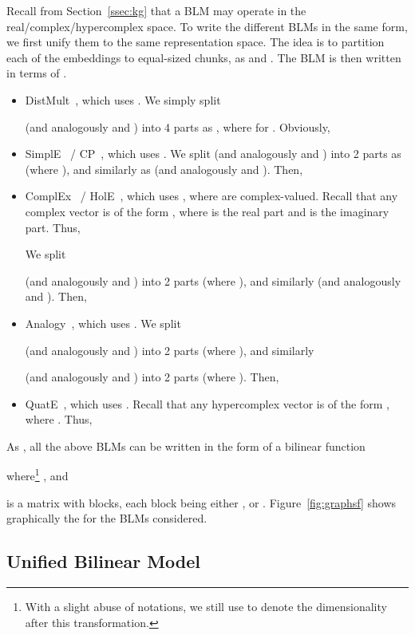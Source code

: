 \documentclass[10pt,journal,compsoc]{IEEEtran}
\begin{document}
Recall 
from Section~\ref{ssec:kg} 
that a BLM may operate in  the
real/complex/hypercomplex space.
To write the different BLMs in the same form,
we first unify them to the same representation space.
The idea is to partition each of the 
embeddings 
to 
 equal-sized chunks, as
 and
.
The BLM 
is then written
in terms of .

\begin{itemize}[leftmargin=*]
\item DistMult~\cite{yang2014embedding}, which uses
.
We simply split 
  
(and analogously  and )
into 4 parts as , where
 for . Obviously, 

\item SimplE~\cite{kazemi2018simple} / CP~\cite{lacroix2018canonical},
which uses
.
We split  
(and analogously  and )
into 2 parts as  (where
),
and similarly  as 
(and analogously  and ). Then,


\item ComplEx~\cite{trouillon2017knowledge} / HolE~\cite{nickel2016holographic},
which uses
, where
  are complex-valued.
Recall that any complex vector 
 is of the form ,
where  is the real part and
 is the imaginary part.
 Thus,
 
We split
 
(and analogously  and )
into 2 parts  (where
),
and  similarly 
(and analogously  and ).
Then,


\item Analogy~\cite{liu2017analogical}, which uses
.
We split 
 
(and analogously  and )
into 2 parts
 (where
),  and similarly
 
(and analogously  and )
into 2 parts
 (where
).
Then,


\item QuatE~\cite{zhang2019quaternion}, which uses
.
Recall that any hypercomplex vector 
is of the form , where
. Thus, 

\end{itemize}
As ,
all the above BLMs can be written in the form of a bilinear function
 
where\footnote{With a slight abuse of notations, we still use  to denote the dimensionality after this transformation.}
,
and

is a matrix
with  blocks,
each block being either , or .
Figure~\ref{fig:graphsf} shows graphically
the  for the BLMs considered.

\subsection{Unified Bilinear Model}
\label{ssec:unifiedBLM}
\end{document}
